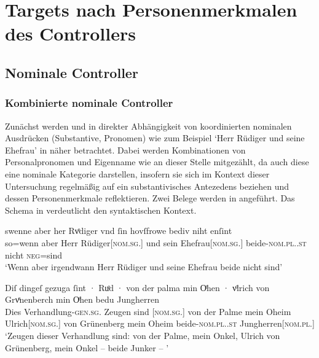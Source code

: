 \section{Targets nach Personenmerkmalen des Controllers}
\label{sec:caotargpers}

\subsection{Nominale Controller}
\subsubsection{Kombinierte nominale Controller}
\label{subsubsec:perscombsgnp}

Zunächst werden  und  in direkter Abhängigkeit von
koordinierten nominalen Ausdrücken (Substantive, Pronomen) wie zum Beispiel
 `Herr Rüdiger und seine Ehefrau' in
 näher betrachtet. Dabei werden Kombinationen von
Personalpronomen und Eigenname wie  an dieser Stelle
mitgezählt, da auch diese eine nominale Kategorie darstellen, insofern sie
sich im Kontext dieser Untersuchung regelmäßig auf ein substantivisches
Antezedens beziehen und dessen Personenmerkmale reflektieren.
Zwei Belege werden in  angeführt. Das Schema in
 verdeutlicht den syntaktischen Kontext.

\begin{exe}
\ex \label{ex:beid2coordncao1}
\begin{xlist}
	\ex \label{ex:beid2coordncao1_1}
		\gll swenne aber her Rvͦdiger vnd ſin
			hovſfrowe bediv niht enſint\\
			so=wenn aber Herr Rüdiger[\textsc{nom.sg.\MascM}] und sein
			Ehefrau[\textsc{nom.sg.\FemF}] beide-\textsc{nom.pl.\NeutMF.st} nicht
			\textsc{neg}=sind\\
			\trans `Wenn aber irgendwann Herr Rüdiger und seine Ehefrau
				beide nicht  sind'
				\parencites(Nr.~3262, Regensburg, 1299)[425,13--14]{cao4}

	\ex \label{ex:beid2coordncao1_2}
		\gll Diſ dingeſ gezuga ſint · Ruͦd · von der palma
			min Oͤhen · vͦlrich von Grvͤnenberch min Oͤhen
			bedu Jungherren \\
			Dies Verhandlung-\textsc{gen.sg.\NeutI} Zeugen sind {}
			[\textsc{nom.sg.\MascM}] {} von der Palme mein Oheim {}
			Ulrich[\textsc{nom.sg.\MascM}] von Grünenberg mein Oheim
			beide-\textsc{nom.pl.\NeutM.st} Jungherren[\textsc{nom.pl.\MascM}] \\
		\trans `Zeugen dieser Verhandlung sind:  von der Palme,
			mein Onkel, Ulrich von Grünenberg, mein Onkel -- beide Junker --
			\textelp{}'
				\parencites(Nr.~2915, Kl.~St.~Urban, Kt.~Luzern, 1298)[213,33--35]{cao4}
\end{xlist}
\end{exe}

